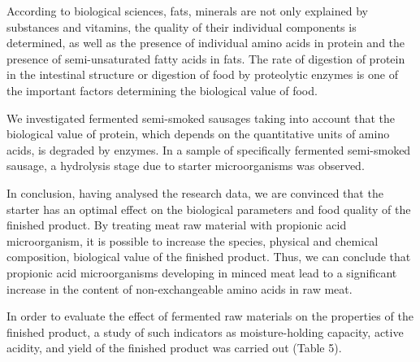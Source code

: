 \begin{multicols}{2}
According to biological sciences, fats, minerals are not only explained
by substances and vitamins, the quality of their individual components
is determined, as well as the presence of individual amino acids in
protein and the presence of semi-unsaturated fatty acids in fats. The
rate of digestion of protein in the intestinal structure or digestion of
food by proteolytic enzymes is one of the important factors determining
the biological value of food.

We investigated fermented semi-smoked sausages taking into account that
the biological value of protein, which depends on the quantitative units
of amino acids, is degraded by enzymes. In a sample of specifically
fermented semi-smoked sausage, a hydrolysis stage due to starter
microorganisms was observed.

In conclusion, having analysed the research data, we are convinced that
the starter has an optimal effect on the biological parameters and food
quality of the finished product. By treating meat raw material with
propionic acid microorganism, it is possible to increase the species,
physical and chemical composition, biological value of the finished
product. Thus, we can conclude that propionic acid microorganisms
developing in minced meat lead to a significant increase in the content
of non-exchangeable amino acids in raw meat.

In order to evaluate the effect of fermented raw materials on the
properties of the finished product, a study of such indicators as
moisture-holding capacity, active acidity, and yield of the finished
product was carried out (Table 5).
\end{multicols}


